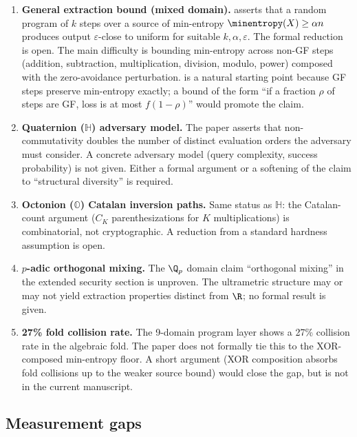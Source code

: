 \begin{enumerate}
  \item \textbf{General \are extraction bound (mixed domain).}
     asserts that a random \are program
    of $k$ steps over a source of min-entropy $\minentropy(X) \geq
    \alpha n$ produces output $\varepsilon$-close to uniform for
    suitable $k, \alpha, \varepsilon$. The formal reduction is
    open. The main difficulty is bounding min-entropy across
    non-GF steps (addition, subtraction, multiplication,
    division, modulo, power) composed with the zero-avoidance
    perturbation.  is a natural starting
    point because GF steps preserve min-entropy exactly; a bound
    of the form ``if a fraction $\rho$ of steps are GF, loss is
    at most $f(1-\rho)$'' would promote the claim.

  \item \textbf{Quaternion ($\mathbb{H}$) adversary model.}
    The paper asserts that non-commutativity doubles the number
    of distinct evaluation orders the adversary must consider.
    A concrete adversary model (query complexity, success
    probability) is not given. Either a formal argument or a
    softening of the claim to ``structural diversity'' is
    required.

  \item \textbf{Octonion ($\mathbb{O}$) Catalan inversion paths.}
    Same status as $\mathbb{H}$: the Catalan-count argument
    ($C_K$ parenthesizations for $K$ multiplications) is
    combinatorial, not cryptographic. A reduction from a
    standard hardness assumption is open.

  \item \textbf{$p$-adic orthogonal mixing.}
    The $\Q_p$ domain claim ``orthogonal mixing'' in the
    extended security section is unproven. The ultrametric
    structure may or may not yield extraction properties
    distinct from $\R$; no formal result is given.

  \item \textbf{27\% fold collision rate.}
    The 9-domain program layer shows a 27\% collision rate in
    the algebraic fold. The paper does not formally tie this to
    the XOR-composed min-entropy floor. A short argument (XOR
    composition absorbs fold collisions up to the weaker source
    bound) would close the gap, but is not in the current
    manuscript.
\end{enumerate}

\subsection{Measurement gaps}
\label{sec:open-problems:measurement}

